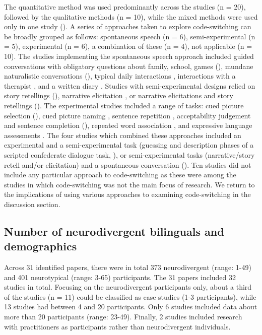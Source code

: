 \documentclass[output=paper]{langscibook}
\begin{document}
The quantitative method was used predominantly across the studies (n = 20), followed by the qualitative methods (n = 10), while the mixed methods were used only in one study (\citealt{AnguloJimenez2020}). A series of approaches taken to explore code-switching can be broadly grouped as follows: spontaneous speech (n = 6), semi-experimental (n = 5), experimental (n = 6), a combination of these (n = 4), not applicable (n = 10). The studies implementing the spontaneous speech approach included guided conversations with obligatory questions about family, school, games (\citealt{Sanz-TorrentEtAl2007}), mundane naturalistic conversations (\citealt{AnguloJimenez2020,Yu2013}), typical daily interactions \citep{CohenEtAl2025}, interactions with a therapist \citep{Ponce-Lawler2017}, and a written diary \citep{Karniol1992}. Studies with semi-experimental designs relied on story retellings (\citealt{Aguilar-MediavillaEtAl2024,KapantzoglouEtAl2021}), narrative elicitation \citep{Mammolito2015}, or narrative elicitations and story retellings (\citealt{GrossCastilla-Earls2023,Iluz-CohenWalters2012}). The experimental studies included a range of tasks: cued picture selection (\citealt{KingEtAl2021}), cued picture naming \citep{SnijdersEtAl2025}, sentence repetition \citep{SoesmanEtAl2022}, acceptability judgement and sentence completion (\citealt{LicerasGarcia-Alcaraz2019}), repeated word association \citep{ShengEtAl2012}, and expressive language assessments \citep{Pert2007}. The four studies which combined these approaches included an experimental and a semi-experimental task (guessing and description phases of a scripted confederate dialogue task, \citealt{GrossKaushanskaya2022}), or semi-experimental tasks (narrative/story retell and/or elicitation) and a spontaneous conversation (\citealt{BlomEtAl2024, Gutiérrez-ClellenEtAl2009, Restrepo2003}). Ten studies did not include any particular approach to code-switching as these were among the studies in which code-switching was not the main focus of research. We return to the implications of using various approaches to examining code-switching in the discussion section.

\subsection{Number of neurodivergent bilinguals and demographics}

Across 31 identified papers, there were in total 373 neurodivergent (range: 1-49) and 401 neurotypical (range: 3-65) participants. The 31 papers included 32 studies in total. Focusing on the neurodivergent participants only, about a third of the studies (n = 11) could be classified as case studies (1-3 participants), while 13 studies had between 4 and 20 participants. Only 6 studies included data about more than 20 participants (range: 23-49). Finally, 2 studies included research with practitioners as participants rather than neurodivergent individuals.
\end{document}
